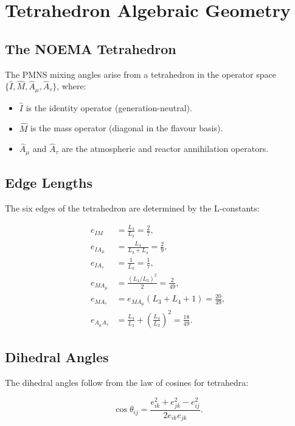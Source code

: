 \chapter{Tetrahedron Algebraic Geometry}
\label{app:tetrahedron}

\section{The NOEMA Tetrahedron}

The PMNS mixing angles arise from a tetrahedron in the operator space
$\{\hat I, \hat M, \hat A_\mu, \hat A_\tau\}$, where:

\begin{itemize}
\item $\hat I$ is the identity operator (generation-neutral).
\item $\hat M$ is the mass operator (diagonal in the flavour basis).
\item $\hat A_\mu$ and $\hat A_\tau$ are the atmospheric and reactor
annihilation operators.
\end{itemize}

\section{Edge Lengths}

The six edges of the tetrahedron are determined by the L-constants:

\[
\begin{aligned}
e_{IM} &= \frac{L_4}{L_3} = \frac{2}{7}, \\[4pt]
e_{IA_\mu} &= \frac{L_4}{L_3+L_4} = \frac{2}{9}, \\[4pt]
e_{IA_\tau} &= \frac{1}{L_3} = \frac{1}{7}, \\[4pt]
e_{MA_\mu} &= \frac{(L_4/L_3)^2}{2} = \frac{2}{49}, \\[4pt]
e_{MA_\tau} &= e_{MA_\mu}(L_3+L_4+1) = \frac{20}{49}, \\[4pt]
e_{A_\mu A_\tau} &= \frac{L_4}{L_3} + \left(\frac{L_4}{L_3}\right)^2 = \frac{18}{49}.
\end{aligned}
\]

\section{Dihedral Angles}

The dihedral angles follow from the law of cosines for tetrahedra:

\[
\cos\theta_{ij} = \frac{e_{ik}^2 + e_{jk}^2 - e_{ij}^2}{2 e_{ik} e_{jk}}.
\]

